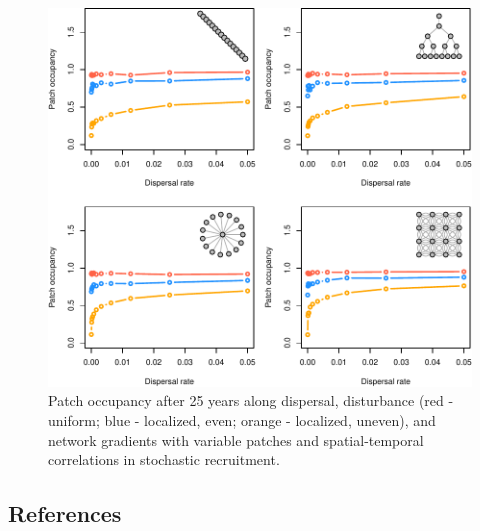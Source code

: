 \documentclass[
]{article}
\begin{document}
\begin{figure}[H]

{\centering \includegraphics{Managing_for_ecological_surprises_in_metapopulations_files/figure-latex/patch occupancy with variable patches and space-time stochasticity-1} 

}

\caption{Patch occupancy after 25 years along dispersal, disturbance (red - uniform; blue - localized, even; orange - localized, uneven), and network gradients with variable patches and spatial-temporal correlations in stochastic recruitment.}\label{fig:patch occupancy with variable patches and space-time stochasticity}
\end{figure}
\newpage

\hypertarget{references}{%
\subsection*{References}\label{references}}
\end{document}
